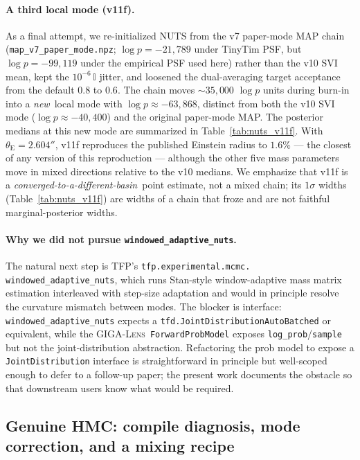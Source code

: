 \documentclass[11pt,letterpaper]{article}
\newcommand{\thetaE}{\ensuremath{\theta_{\mathrm{E}}}}
\newcommand{\gigalens}{\textsc{GIGA-Lens}}
\begin{document}
\paragraph{A third local mode (v11f).} As a final attempt, we
re-initialized NUTS from the v7 paper-mode MAP chain
(\texttt{map\_v7\_paper\_mode.npz}; $\log p = -21{,}789$ under TinyTim
PSF, but $\log p = -99{,}119$ under the empirical PSF used here)
rather than the v10 SVI mean, kept the $10^{-6}\,\mathbb{I}$ jitter,
and loosened the dual-averaging target acceptance from the default
$0.8$ to $0.6$. The chain moves $\sim 35{,}000$ $\log p$ units during
burn-in into a {\it new}\ local mode with $\log p \approx -63{,}868$,
distinct from both the v10 SVI mode ($\log p \approx -40{,}400$) and
the original paper-mode MAP. The posterior medians at this new mode
are summarized in Table~\ref{tab:nuts_v11f}. With $\thetaE=2.604''$,
v11f reproduces the published Einstein radius to $1.6\%$ --- the
closest of any version of this reproduction --- although the other
five mass parameters move in mixed directions relative to the v10
medians. We emphasize that v11f is a {\it converged-to-a-different-basin}\
point estimate, not a mixed chain; its $1\sigma$ widths
(Table~\ref{tab:nuts_v11f}) are widths of a chain that froze and are
not faithful marginal-posterior widths.

\paragraph{Why we did not pursue \texttt{windowed\_adaptive\_nuts}.}
The natural next step is TFP's \texttt{tfp.experimental.mcmc.
windowed\_adaptive\_nuts}, which runs Stan-style window-adaptive mass
matrix estimation interleaved with step-size adaptation and would in
principle resolve the curvature mismatch between modes. The blocker
is interface: \texttt{windowed\_adaptive\_nuts} expects a
\texttt{tfd.JointDistribution\-Auto\-Batched} or equivalent, while the
\gigalens\ \texttt{ForwardProbModel} exposes
\texttt{log\_prob}/\texttt{sample} but not the joint-distribution
abstraction. Refactoring the prob model to expose a
\texttt{JointDistribution} interface is straightforward in principle
but well-scoped enough to defer to a follow-up paper; the present
work documents the obstacle so that downstream users know what would
be required.

\subsection{Genuine HMC: compile diagnosis, mode correction,
            and a mixing recipe}
\label{sec:hmc}
\end{document}
